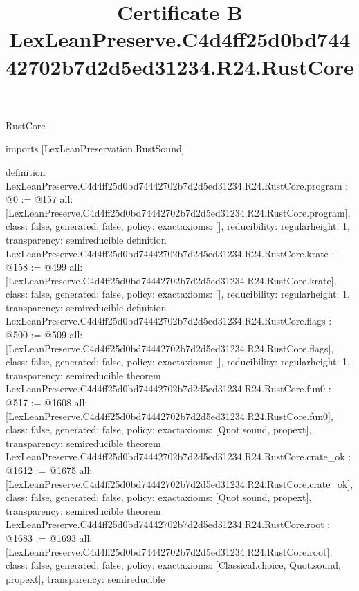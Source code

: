 \begin{lexlean}{RustCore}
\title{Certificate B LexLeanPreserve.C4d4ff25d0bd74442702b7d2d5ed31234.R24.RustCore}
\begin{coremodule}
imports [LexLeanPreservation.RustSound]

definition LexLeanPreserve.C4d4ff25d0bd74442702b7d2d5ed31234.R24.RustCore.program : @0 := @157 {
  all: [LexLeanPreserve.C4d4ff25d0bd74442702b7d2d5ed31234.R24.RustCore.program],
  class: false,
  generated: false,
  policy: exact{axioms: []},
  reducibility: regular{height: 1},
  transparency: semireducible
}
definition LexLeanPreserve.C4d4ff25d0bd74442702b7d2d5ed31234.R24.RustCore.krate : @158 := @499 {
  all: [LexLeanPreserve.C4d4ff25d0bd74442702b7d2d5ed31234.R24.RustCore.krate],
  class: false,
  generated: false,
  policy: exact{axioms: []},
  reducibility: regular{height: 1},
  transparency: semireducible
}
definition LexLeanPreserve.C4d4ff25d0bd74442702b7d2d5ed31234.R24.RustCore.flags : @500 := @509 {
  all: [LexLeanPreserve.C4d4ff25d0bd74442702b7d2d5ed31234.R24.RustCore.flags],
  class: false,
  generated: false,
  policy: exact{axioms: []},
  reducibility: regular{height: 1},
  transparency: semireducible
}
theorem LexLeanPreserve.C4d4ff25d0bd74442702b7d2d5ed31234.R24.RustCore.fun0 : @517 := @1608 {
  all: [LexLeanPreserve.C4d4ff25d0bd74442702b7d2d5ed31234.R24.RustCore.fun0],
  class: false,
  generated: false,
  policy: exact{axioms: [Quot.sound, propext]},
  transparency: semireducible
}
theorem LexLeanPreserve.C4d4ff25d0bd74442702b7d2d5ed31234.R24.RustCore.crate_ok : @1612 := @1675 {
  all: [LexLeanPreserve.C4d4ff25d0bd74442702b7d2d5ed31234.R24.RustCore.crate_ok],
  class: false,
  generated: false,
  policy: exact{axioms: [Quot.sound, propext]},
  transparency: semireducible
}
theorem LexLeanPreserve.C4d4ff25d0bd74442702b7d2d5ed31234.R24.RustCore.root : @1683 := @1693 {
  all: [LexLeanPreserve.C4d4ff25d0bd74442702b7d2d5ed31234.R24.RustCore.root],
  class: false,
  generated: false,
  policy: exact{axioms: [Classical.choice, Quot.sound, propext]},
  transparency: semireducible
}


\end{coremodule}
\end{lexlean}
